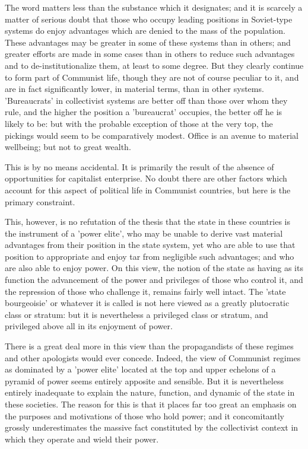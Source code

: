 The word matters less than the substance which it designates; and it is scarcely a matter of serious doubt that those who occupy leading positions in Soviet-type systems do enjoy advantages which are denied to the mass of the population. These advantages may be greater in some of these systems than in others; and greater efforts are made in some cases than in others to reduce such advantages and to de\hyp{}institutionalize them, at least to some degree. But they clearly continue to form part of Communist life, though they are not of course peculiar to it, and are in fact significantly lower, in material terms, than in other systems. 'Bureaucrats' in collectivist systems are better off than those over whom they rule, and the higher the position a 'bureaucrat' occupies, the better off he is likely to be: but with the probable exception of those at the very top, the pickings would seem to be comparatively modest. Office is an avenue to material wellbeing; but not to great wealth.

This is by no means accidental. It is primarily the result of the absence of opportunities for capitalist enterprise. No doubt there are other factors which account for this aspect of political life in Communist countries, but here is the primary constraint.

This, however, is no refutation of the thesis that the state in these countries is the instrument of a 'power elite', who may be unable to derive vast material advantages from their position in the state system, yet who are able to use that position to appropriate and enjoy tar from negligible such advantages; and who are also able to enjoy power. On this view, the notion of the state as having as its function the advancement of the power and privileges of those who control it, and the repression of those  who challenge it, remains fairly well intact. The 'state bourgeoisie' or whatever it is called is not here viewed as a greatly plutocratic class or stratum: but it is nevertheless a privileged class or stratum, and privileged above all in its enjoyment of power.

There is a great deal more in this view than the propagandists of these regimes and other apologists would ever concede. Indeed, the view of Communist regimes as dominated by a 'power elite' located at the top and upper echelons of a pyramid of power seems entirely apposite and sensible. But it is nevertheless entirely inadequate to explain the nature, function, and dynamic of the state in these societies. The reason for this is that it places far too great an emphasis on the purposes and motivations of those who hold power; and it concomitantly grossly underestimates the massive fact constituted by the collectivist context in which they operate and wield their power.

